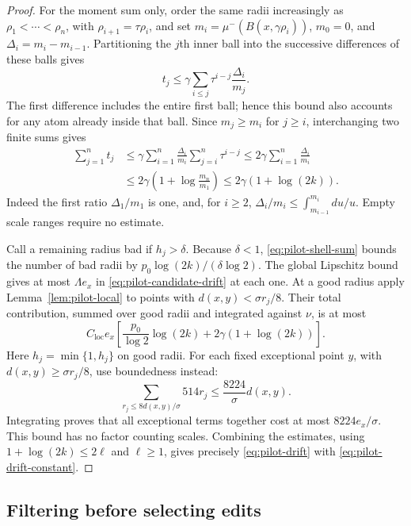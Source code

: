 \begin{proof}
For the moment sum only, order the same radii increasingly as
$\rho_1<\cdots<\rho_n$, with $\rho_{i+1}=\tau\rho_i$, and set
$m_i=\mu^-(B(x,\gamma\rho_i))$, $m_0=0$, and
$\Delta_i=m_i-m_{i-1}$.  Partitioning the $j$th inner ball into the
successive differences of these balls gives
\[
 t_j\le\gamma\sum_{i\le j}
                 \tau^{i-j}\frac{\Delta_i}{m_j}.
\]
The first difference includes the entire first ball; hence this bound
also accounts for any atom already inside that ball.  Since $m_j\ge m_i$
for $j\ge i$, interchanging two finite sums gives
\begin{align}
 \sum_{j=1}^n t_j
 &\le\gamma\sum_{i=1}^n\frac{\Delta_i}{m_i}
                  \sum_{j=i}^n\tau^{i-j}
 \le2\gamma\sum_{i=1}^n\frac{\Delta_i}{m_i}\nonumber\\
 &\le2\gamma\left(1+\log\frac{m_n}{m_1}\right)
 \le2\gamma(1+\log(2k)).
 \label{eq:pilot-moment-sum}
\end{align}
Indeed the first ratio $\Delta_1/m_1$ is one, and, for $i\ge2$,
$\Delta_i/m_i\le\int_{m_{i-1}}^{m_i}du/u$.  Empty scale ranges require
no estimate.

Call a remaining radius bad if $h_j>\delta$.  Because $\delta<1$,
\eqref{eq:pilot-shell-sum} bounds the number of bad radii by
$p_0\log(2k)/(\delta\log2)$.  The global Lipschitz bound gives at most
$\Lambda e_x$ in \eqref{eq:pilot-candidate-drift} at each one.  At a good
radius apply Lemma~\ref{lem:pilot-local} to points with
$d(x,y)<\sigma r_j/8$.  Their total contribution, summed over good
radii and integrated against $\nu$, is at most
\[
 C_{\mathrm{loc}}e_x
 \left[\frac{p_0}{\log2}\log(2k)
                      +2\gamma(1+\log(2k))\right].
\]
Here $h_j=\min\{1,h_j\}$ on good radii.  For each fixed exceptional
point $y$, with $d(x,y)\ge\sigma r_j/8$, use boundedness instead:
\begin{equation}
 \sum_{r_j\le8d(x,y)/\sigma}514r_j
       \le\frac{8224}{\sigma}d(x,y).
 \label{eq:pilot-far-scales}
\end{equation}
Integrating proves that all exceptional terms together cost at most
$8224e_x/\sigma$.  This bound has no factor counting scales.
Combining the estimates, using $1+\log(2k)\le2\ell$ and $\ell\ge1$,
gives precisely \eqref{eq:pilot-drift} with
\eqref{eq:pilot-drift-constant}.
\end{proof}

\subsection{Filtering before selecting edits}

